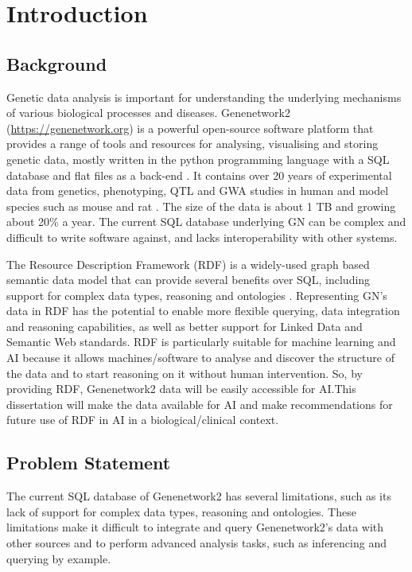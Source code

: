 \chapter{Introduction}\label{chap:Introduction}
\section{Background}

Genetic data analysis is important for understanding the underlying mechanisms of various biological processes and diseases.  Genenetwork2 (\url{https://genenetwork.org}) is a powerful open-source software platform that provides a range of tools and resources for analysing, visualising and storing genetic data, mostly written in the python programming language with a SQL database and flat files as a back-end \citetext{\citealp{sloan2016genenetwork}; \citealp*{mulligan2017genenetwork}}.  It contains over 20 years of experimental data from genetics, phenotyping, QTL and GWA studies in human and model species such as mouse and rat \citep{sloan2016genenetwork}.  The size of the data is about 1 TB and growing about 20\% a year.  The current SQL database underlying GN can be complex and difficult to write software against, and lacks interoperability with other systems.

The Resource Description Framework (RDF) is a widely-used graph based semantic data model that can provide several benefits over SQL, including support for complex data types, reasoning and ontologies \citep*{candan2001resource,allemang2011semantic}.  Representing GN's data in RDF has the potential to enable more flexible querying, data integration and reasoning capabilities, as well as better support for Linked Data and Semantic Web standards.  RDF is particularly suitable for machine learning and AI because it allows machines/software to analyse and discover the structure of the data and to start reasoning on it without human intervention.  So, by providing RDF, Genenetwork2 data will be easily accessible for AI.\@  This dissertation will make the data available for AI and make recommendations for future use of RDF in AI in a biological/clinical context.

\section{Problem Statement}

The current SQL database of Genenetwork2 has several limitations, such as its lack of support for complex data types, reasoning and ontologies.  These limitations make it difficult to integrate and query Genenetwork2's data with other sources and to perform advanced analysis tasks, such as inferencing and querying by example.

